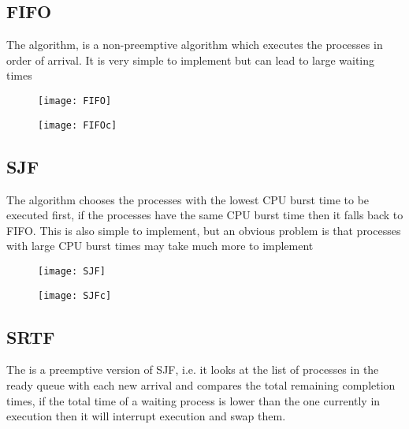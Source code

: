 	\subsection{FIFO}

		\par{The  algorithm, is a non-preemptive algorithm which executes the processes in order of arrival. It is very simple to implement but can lead to large waiting times}

	\begin{figure}[H]
		\begin{center}
		\texttt{[image: FIFO]}
		\end{center}
		\begin{center}
		\texttt{[image: FIFOc]}
		\end{center}
	\end{figure}

	\subsection{SJF}

		\par{The  algorithm chooses the processes with the lowest CPU burst time to be executed first, if the processes have the same CPU burst time then it falls back to FIFO. This is also simple to implement, but an obvious problem is that processes with large CPU burst times may take much more to implement}

		\begin{figure}[H]
		\begin{center}
		\texttt{[image: SJF]}
		\end{center}
		\begin{center}
		\texttt{[image: SJFc]}
		\end{center}
	\end{figure}

	\subsection{SRTF}

		\par{The  is a preemptive version of SJF, i.e. it looks at the list of processes in the ready queue with each new arrival and compares the total remaining completion times, if the total time of a waiting process is lower than the one currently in execution then it will interrupt execution and swap them. }

